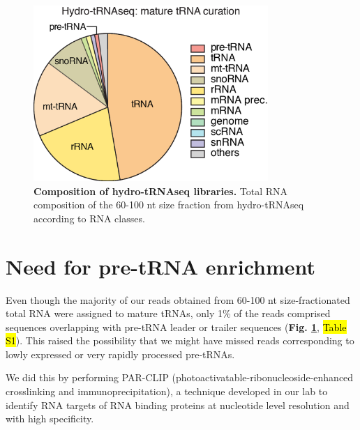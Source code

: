 \documentclass[12pt]{rockefeller}
\begin{document}
\begin{figure}[!ht]%
\centering
\includegraphics[width=3.5in]{paper2a.png}%
\caption[Composition of hydro-tRNAseq libraries]{\textbf{Composition of hydro-tRNAseq libraries.} Total RNA composition of the 60-100 nt size fraction from hydro-tRNAseq according to RNA classes.}
\centering
\label{paper2a}%
\end{figure}

\section{Need for pre-tRNA enrichment}
Even though the majority of our reads obtained from 60-100 nt size-fractionated total RNA were assigned to mature tRNAs, only 1\% of the reads comprised sequences overlapping with pre-tRNA leader or trailer sequences (\textbf{Fig. \ref{paper2a}}, \hl{Table S1}).
This raised the possibility that we might have missed reads corresponding to lowly expressed or very rapidly processed pre-tRNAs.

We did this by performing PAR-CLIP (photoactivatable-ribonucleoside-enhanced crosslinking and immunoprecipitation), a technique developed in our lab to identify RNA targets of RNA binding proteins at nucleotide level resolution and with high specificity. 
\end{document}
